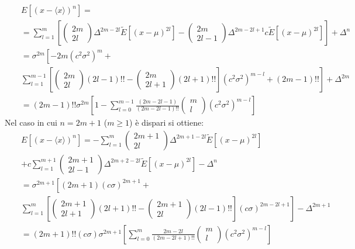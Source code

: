 \begin{eqnarray*}
&&E\left[(x-\langle x\rangle)^n\right]=\\
&&=\sum_{l=1}^m\left[\left(\begin{array}{c}2m\\2l\end{array}\right)\Delta^{2m-2l}\widetilde E\left[(x-\mu)^{2l}\right]-\left(\begin{array}{c}2m\\2l-1\end{array}\right)\Delta^{2m-2l+1}c\widetilde E\left[(x-\mu)^{2l}\right]\right]+\Delta^n\\
&&=\sigma^{2m}\left[-2m(c^2\sigma^2)^m+\right.\\
&&\left.\sum_{l=1}^{m-1}\left[\left(\begin{array}{c}2m\\2l\end{array}\right)(2l-1)!!-\left(\begin{array}{c}2m\\2l+1\end{array}\right)(2l+1)!!\right](c^2\sigma^2)^{m-l}+(2m-1)!!\right]+\Delta^{2m}\\
&&=(2m-1)!!\sigma^{2m}\left[1-\sum_{l=0}^{m-1}\frac{(2m-2l-1)}{(2m-2l-1)!!}\left(\begin{array}{c}m\\l\end{array}\right)(c^2\sigma^2)^{m-l}\right]
\end{eqnarray*}
Nel caso in cui $n=2m+1$ ($m\ge 1$) \`e dispari si ottiene:
\begin{eqnarray*}
&&E\left[(x-\langle x\rangle)^n\right]=-\sum_{l=1}^m\left(\begin{array}{c}2m+1\\2l\end{array}\right)\Delta^{2m+1-2l}\widetilde E\left[(x-\mu)^{2l}\right]\\
&&+c\sum_{l=1}^{m+1}\left(\begin{array}{c}2m+1\\2l-1\end{array}\right)\Delta^{2m+2-2l}\widetilde E\left[(x-\mu)^{2l}\right]-\Delta^n\\
&&=\sigma^{2m+1}\left[(2m+1)(c\sigma)^{2m+1}+\right.\\
&&\left.\sum_{l=1}^m\left[\left(\begin{array}{c}2m+1\\2l+1\end{array}\right)(2l+1)!!-\left(\begin{array}{c}2m+1\\2l\end{array}\right)(2l-1)!!\right](c\sigma)^{2m-2l+1}\right]-\Delta^{2m+1}\\
&&=(2m+1)!!(c\sigma)\sigma^{2m+1}\left[\sum_{l=0}^m\frac{2m-2l}{(2m-2l+1)!!}\left(\begin{array}{c}m\\l\end{array}\right)(c^2\sigma^2)^{m-l}\right]\\
\end{eqnarray*}
